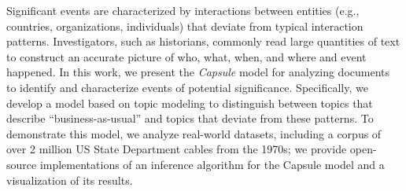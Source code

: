 Significant events are characterized by interactions between entities (e.g., countries, organizations, individuals) that deviate from typical interaction patterns.  Investigators, such as historians, commonly read large quantities of text to construct an accurate picture of who, what, when, and where and event happened.  In this work, we present the \emph{Capsule} model for analyzing documents to identify and characterize events of potential significance.
Specifically, we develop a model based on topic modeling to distinguish between topics that describe ``business-as-usual'' and topics that deviate from these patterns.
To demonstrate this model, we analyze real-world datasets, including a corpus of over 2 million US State Department cables from the 1970s; we provide open-source implementations of an inference algorithm for the Capsule model and a visualization of its results.